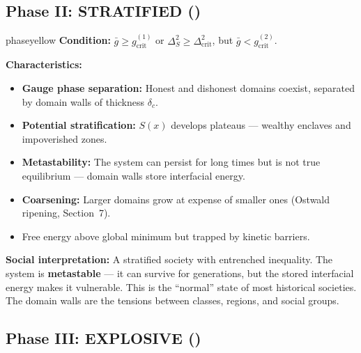 \documentclass[12pt,a4paper]{article}
\theoremstyle{plain}
\theoremstyle{definition}
\newcommand{\Sf}{S}                   %
\newcommand{\deltac}{\delta_c}        %
\newcommand{\gbar}{\bar{g}}           %
\begin{document}
\subsection{Phase II: STRATIFIED ()}

\begin{phasebox}{phaseyellow}
\label{phase:stratified}
\textbf{Condition:} $\gbar \ge g_{\text{crit}}^{(1)}$ or $\Delta_S^2 \ge \Delta_{\text{crit}}^2$,
but $\gbar < g_{\text{crit}}^{(2)}$.

\textbf{Characteristics:}
\begin{itemize}
    \item \textbf{Gauge phase separation:} Honest and dishonest domains coexist,
          separated by domain walls of thickness $\deltac$.
    \item \textbf{Potential stratification:} $\Sf(x)$ develops plateaus —
          wealthy enclaves and impoverished zones.
    \item \textbf{Metastability:} The system can persist for long times
          but is not true equilibrium — domain walls store interfacial energy.
    \item \textbf{Coarsening:} Larger domains grow at expense of smaller ones
          (Ostwald ripening, Section~7).
    \item Free energy above global minimum but trapped by kinetic barriers.
\end{itemize}

\textbf{Social interpretation:} A stratified society with entrenched inequality.
The system is \textbf{metastable} — it can survive for generations, but the
stored interfacial energy makes it vulnerable. This is the ``normal'' state
of most historical societies. The domain walls are the tensions between
classes, regions, and social groups.
\end{phasebox}

\subsection{Phase III: EXPLOSIVE ()}
\end{document}
